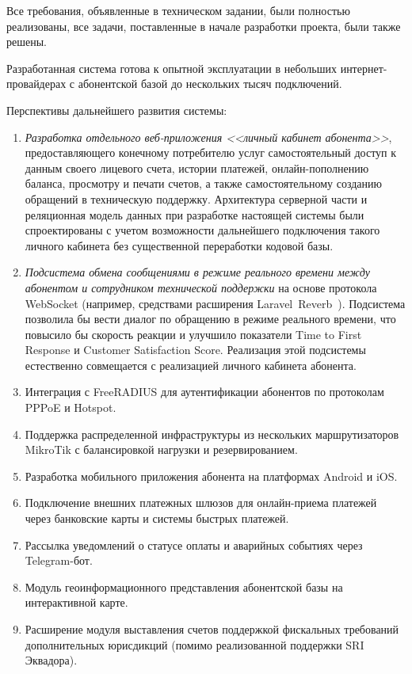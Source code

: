 Все требования, объявленные в техническом задании, были полностью реализованы, все задачи, поставленные в начале разработки проекта, были также решены.

Разработанная система готова к опытной эксплуатации в небольших интернет-провайдерах с абонентской базой до нескольких тысяч подключений. %

Перспективы дальнейшего развития системы:
\begin{enumerate}
\item \emph{Разработка отдельного веб-приложения <<личный кабинет абонента>>}, предоставляющего конечному потребителю услуг самостоятельный доступ к данным своего лицевого счета, истории платежей, онлайн-пополнению баланса, просмотру и печати счетов, а также самостоятельному созданию обращений в техническую поддержку. Архитектура серверной части и реляционная модель данных при разработке настоящей системы были спроектированы с учетом возможности дальнейшего подключения такого личного кабинета без существенной переработки кодовой базы.
\item \emph{Подсистема обмена сообщениями в режиме реального времени между абонентом и сотрудником технической поддержки} на основе протокола WebSocket (например, средствами расширения Laravel~Reverb~\cite{reverb}). Подсистема позволила бы вести диалог по обращению в режиме реального времени, что повысило бы скорость реакции и улучшило показатели Time to First Response и Customer Satisfaction Score. Реализация этой подсистемы естественно совмещается с реализацией личного кабинета абонента.
\item Интеграция с FreeRADIUS для аутентификации абонентов по протоколам PPPoE и Hotspot.
\item Поддержка распределенной инфраструктуры из нескольких маршрутизаторов MikroTik с балансировкой нагрузки и резервированием.
\item Разработка мобильного приложения абонента на платформах Android и iOS.
\item Подключение внешних платежных шлюзов для онлайн-приема платежей через банковские карты и системы быстрых платежей.
\item Рассылка уведомлений о статусе оплаты и аварийных событиях через Telegram-бот.
\item Модуль геоинформационного представления абонентской базы на интерактивной карте.
\item Расширение модуля выставления счетов поддержкой фискальных требований дополнительных юрисдикций (помимо реализованной поддержки SRI Эквадора).
\end{enumerate}
